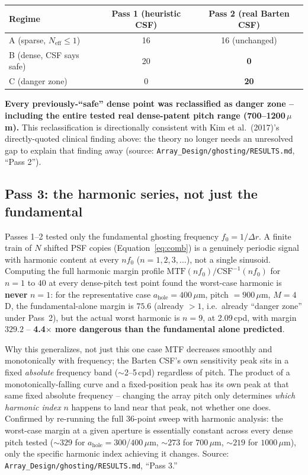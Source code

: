 \begin{center}
\begin{tabular}{lcc}
\toprule
Regime & Pass 1 (heuristic CSF) & Pass 2 (real Barten CSF) \\
\midrule
A (sparse, $N_{\mathrm{eff}}\le1$) & 16 & 16 (unchanged) \\
B (dense, CSF says safe) & 20 & \textbf{0} \\
C (danger zone) & 0 & \textbf{20} \\
\bottomrule
\end{tabular}
\end{center}
\textbf{Every previously-``safe'' dense point was reclassified as danger zone --
including the entire tested real dense-patent pitch range (700--1200\,$\mu$m).} This
reclassification is directionally consistent with Kim et al.\ (2017)'s directly-quoted
clinical finding above: the theory no longer needs an unresolved gap to explain that
finding away (source: \texttt{Array\_Design/ghosting/RESULTS.md}, ``Pass 2'').

\subsection{Pass 3: the harmonic series, not just the fundamental}
\label{sec:harmonic}
Passes 1--2 tested only the fundamental ghosting frequency $f_0=1/\Delta r$. A finite
train of $N$ shifted PSF copies (Equation~\ref{eq:comb}) is a genuinely periodic signal
with harmonic content at every $n f_0$ ($n=1,2,3,\dots$), not a single sinusoid.
Computing the full harmonic margin profile $\mathrm{MTF}(nf_0)/\mathrm{CSF}^{-1}(nf_0)$
for $n=1$ to $40$ at every dense-pitch test point found the worst-case harmonic is
\textbf{never} $n=1$: for the representative case $a_{\mathrm{hole}}=400\,\mu$m,
pitch $=900\,\mu$m, $M=4$D, the fundamental-alone margin is $75.6$ (already $>1$, i.e.\
already ``danger zone'' under Pass~2), but the actual worst harmonic is $n=9$, at
2.09\,cpd, with margin $329.2$ -- \textbf{4.4$\times$ more dangerous than the
fundamental alone predicted}.

\begin{keybox}{Why this generalizes, not just this one case}
MTF decreases smoothly and monotonically with frequency; the Barten CSF's own
sensitivity peak sits in a fixed \emph{absolute} frequency band ($\sim$2--5\,cpd)
regardless of pitch. The product of a monotonically-falling curve and a fixed-position
peak has its own peak at that same fixed absolute frequency -- changing the array pitch
only determines \emph{which harmonic index} $n$ happens to land near that peak, not
whether one does. Confirmed by re-running the full 36-point sweep with harmonic
analysis: the worst-case margin at a given aperture is essentially constant across
every dense pitch tested ($\sim329$ for $a_{\mathrm{hole}}=300$/$400\,\mu$m, $\sim273$
for $700\,\mu$m, $\sim219$ for $1000\,\mu$m), only the specific harmonic index achieving
it changes. Source: \texttt{Array\_Design/ghosting/RESULTS.md}, ``Pass 3.''
\end{keybox}

